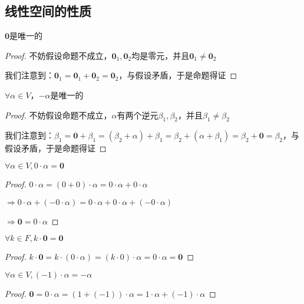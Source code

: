 \documentclass[12pt, a4paper, oneside, UTF8]{ctexbook}
\begin{document}
		\subsection{线性空间的性质}
		\begin{para}{0}
			\point{}
				\begin{proposition}
					$\mathbf{0}$是唯一的
				\end{proposition}
				\begin{proof}
					不妨假设命题不成立，$\mathbf{0}_1,\mathbf{0}_2$均是零元，并且$\mathbf{0}_1 \neq \mathbf{0}_2$

					我们注意到：$\mathbf{0}_1 = \mathbf{0}_1 + \mathbf{0}_2 = \mathbf{0}_2$，与假设矛盾，于是命题得证
				\end{proof}
			\point{}
				\begin{proposition}
					$\forall \alpha \in V$，$-\alpha $是唯一的
				\end{proposition}
				\begin{proof}
					不妨假设命题不成立，$\alpha $有两个逆元$\beta_1,\beta_2$，并且$\beta_1 \neq \beta_2$

					我们注意到：$\beta_1 = \mathbf{0} + \beta_1 = (\beta_2 + \alpha )+\beta_1 = \beta_2 + (\alpha +\beta_1) = \beta_2 + \mathbf{0}= \beta_2$，与假设矛盾，于是命题得证
				\end{proof}
			\point{}
				\begin{proposition}
					$\forall \alpha \in V,0\cdot \alpha = \mathbf{0}$
				\end{proposition}
				\begin{proof}
					$0\cdot \alpha =(0+0)\cdot \alpha =0\cdot \alpha +0\cdot \alpha $

					$\Rightarrow 0\cdot \alpha + (-0\cdot \alpha )=0\cdot \alpha + 0\cdot \alpha +(-0\cdot \alpha )$

					$\Rightarrow \mathbf{0} = 0\cdot \alpha $
				\end{proof}
			\point{}
				\begin{proposition}
					$\forall k \in F,k \cdot \mathbf{0} = \mathbf{0}$
				\end{proposition}
				\begin{proof}
					$k \cdot \mathbf{0} = k\cdot (0\cdot \alpha ) = (k\cdot 0)\cdot \alpha = 0\cdot \alpha = \mathbf{0}$
				\end{proof}
			\point{}
				\begin{proposition}
					$\forall \alpha \in V,(-1)\cdot \alpha = -\alpha $
				\end{proposition}
				\begin{proof}
					$\mathbf{0} = 0\cdot \alpha =\left(1+(-1)\right)\cdot \alpha =1\cdot \alpha + (-1)\cdot \alpha $


\end{proof}
\end{para}
\end{document}
